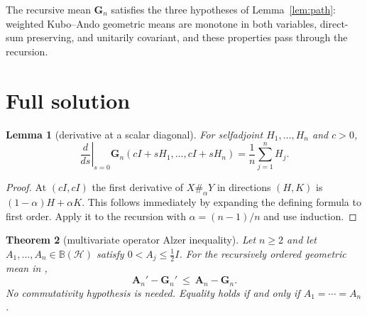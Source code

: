 \documentclass[11pt]{article}
\newtheorem{theorem}{Theorem}
\newtheorem{lemma}[theorem]{Lemma}
\newcommand{\BH}{\mathbb B(\mathcal H)}
\newcommand{\G}{\mathbf G}
\newcommand{\A}{\mathbf A}
\begin{document}
The recursive mean $\G_n$ satisfies the three hypotheses of
Lemma~\ref{lem:path}: weighted Kubo--Ando geometric means are monotone in
both variables, direct-sum preserving, and unitarily covariant, and these
properties pass through the recursion.

\section{Full solution}

\begin{lemma}[derivative at a scalar diagonal]\label{lem:derivative}
For selfadjoint $H_1,\ldots,H_n$ and $c>0$,
\[
 \left.\frac{d}{ds}\right|_{s=0}
 \G_n(cI+sH_1,\ldots,cI+sH_n)
 =\frac1n\sum_{j=1}^nH_j.
\]
\end{lemma}

\begin{proof}
At $(cI,cI)$ the first derivative of $X\#_\alpha Y$ in directions $(H,K)$
is $(1-\alpha)H+\alpha K$.  This follows immediately by expanding the
defining formula to first order.  Apply it to the recursion with
$\alpha=(n-1)/n$ and use induction.
\end{proof}

\begin{theorem}[multivariate operator Alzer inequality]\label{thm:main}
Let $n\geq2$ and let $A_1,\ldots,A_n\in\BH$ satisfy
$0<A_j\leq\tfrac12I$.  For the recursively ordered geometric mean in
\cite{MM},
\[
 \boxed{\quad \A_n'-\G_n'\ \leq\ \A_n-\G_n.\quad}
\]
No commutativity hypothesis is needed.  Equality holds if and only if
$A_1=\cdots=A_n$.
\end{theorem}
\end{document}
